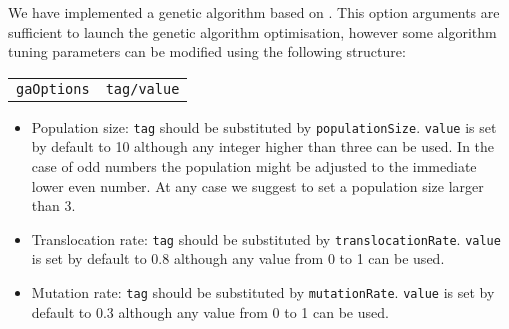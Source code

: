 \documentclass[a4paper, 11pt]{article}
\begin{document}
We have implemented a genetic algorithm based on \cite{goldberg89}. 
This option arguments are sufficient to launch the genetic algorithm optimisation, however some algorithm tuning parameters can be modified using the following structure:\\[1.5ex]
\begin{tabular}{cc}\texttt{gaOptions}&\texttt{tag/value}\end{tabular}
\begin{itemize}
\item Population size: 
  \texttt{tag} should be substituted by \texttt{populationSize}.
  \texttt{value} is set by default to 10 although any integer higher than three can be used.
  In the case of odd numbers the population might be adjusted to the immediate lower even number.
  At any case we suggest to set a population size larger than 3.
\item Translocation rate:
  \texttt{tag} should be substituted by \texttt{translocationRate}.
  \texttt{value} is set by default to 0.8 although any value from 0 to 1 can be used.
\item Mutation rate:
  \texttt{tag} should be substituted by \texttt{mutationRate}.
  \texttt{value} is set by default to 0.3 although any value from 0 to 1 can be used.
\end{itemize}
\end{document}
